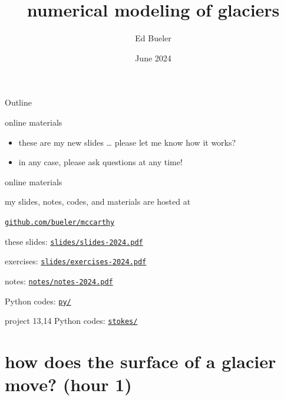 \documentclass[10pt,dvipsnames]{beamer}
\title{numerical modeling of glaciers}
\date{June 2024}
\author{Ed Bueler}
\institute{Porphyry Place, McCarthy, Alaska \\ \phantom{foo} \\ version 1.0}
\begin{document}
\graphicspath{{figs/}{../figures/}}

\maketitle

\begin{frame}{Outline}
  \tableofcontents
\end{frame}


\begin{frame}{online materials}

\begin{itemize}
\item these are my \alert{new slides} \dots\xspace please let me know how it works?
\item in any case, \alert{please ask questions at any time!}
\end{itemize}

\bigskip

\begin{block}{online materials}

my slides, notes, codes, and materials are hosted at

\medskip
\centerline{\href{https://github.com/bueler/mccarthy}{\texttt{github.com/bueler/mccarthy}}}
\end{block}

\medskip
{\footnotesize
these slides: \href{https://github.com/bueler/mccarthy/blob/master/slides/slides-2024.pdf}{\texttt{slides/slides-2024.pdf}}

exercises: \href{https://github.com/bueler/mccarthy/blob/master/slides/exercises-2024.pdf}{\texttt{slides/exercises-2024.pdf}}

notes: \href{https://github.com/bueler/mccarthy/blob/master/notes/notes-2024.pdf}{\texttt{notes/notes-2024.pdf}}

Python codes: \href{https://github.com/bueler/mccarthy/tree/master/py}{\texttt{py/}}

project 13,14 Python codes: \href{https://github.com/bueler/mccarthy/tree/master/stokes}{\texttt{stokes/}}

}
\end{frame}


\section[how does the surface of a glacier move?]{\textbf{how does the surface of a glacier move?} (hour 1)}
\end{document}
